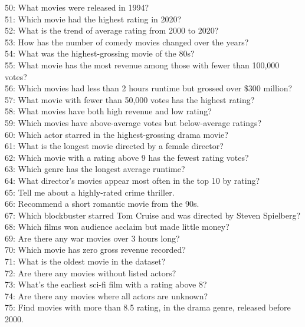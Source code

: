 \documentclass[
a4paper,
12pt,
]{article}
\begin{document}
\begin{appendices}
50: What movies were released in 1994?\\
51: Which movie had the highest rating in 2020?\\
52: What is the trend of average rating from 2000 to 2020?\\
53: How has the number of comedy movies changed over the years?\\
54: What was the highest-grossing movie of the 80s?\\
55: What movie has the most revenue among those with fewer than 100,000 votes?\\
56: Which movies had less than 2 hours runtime but grossed over \$300 million?\\
57: What movie with fewer than 50,000 votes has the highest rating?\\
58: What movies have both high revenue and low rating?\\
59: Which movies have above-average votes but below-average ratings?\\
60: Which actor starred in the highest-grossing drama movie?\\
61: What is the longest movie directed by a female director?\\
62: Which movie with a rating above 9 has the fewest rating votes?\\
63: Which genre has the longest average runtime?\\
64: What director’s movies appear most often in the top 10 by rating?\\
65: Tell me about a highly-rated crime thriller.\\
66: Recommend a short romantic movie from the 90s.\\
67: Which blockbuster starred Tom Cruise and was directed by Steven Spielberg?\\
68: Which films won audience acclaim but made little money?\\
69: Are there any war movies over 3 hours long?\\
70: Which movie has zero gross revenue recorded?\\
71: What is the oldest movie in the dataset?\\
72: Are there any movies without listed actors?\\
73: What’s the earliest sci-fi film with a rating above 8?\\
74: Are there any movies where all actors are unknown?\\
75: Find movies with more than 8.5 rating, in the drama genre, released before 2000.\\

\end{appendices}
\end{document}
